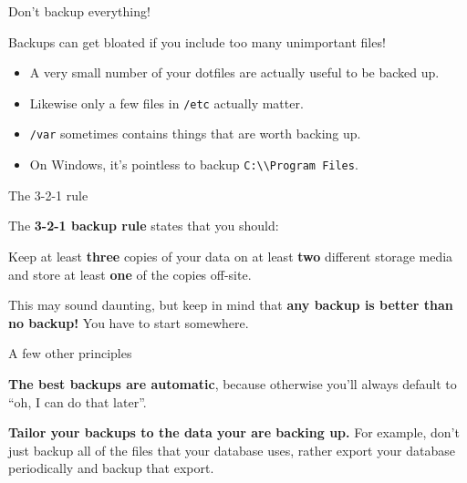 \documentclass{lug}
\begin{document}
\begin{frame}{Don't backup everything!}

    Backups can get bloated if you include too many unimportant files!

    \begin{itemize}[<+->]
        \item A very small number of your dotfiles are actually useful to be
            backed up.
        \item Likewise only a few files in \texttt{/etc} actually matter.
        \item \texttt{/var} sometimes contains things that are worth backing up.
        \item On Windows, it's pointless to backup
            \texttt{C:\textbackslash\textbackslash Program Files}.
    \end{itemize}

\end{frame}

\begin{frame}{The 3-2-1 rule}

    The \textbf{3-2-1 backup rule} states that you should:

    Keep at least \textbf{three} copies of your data \pause on at least
    \textbf{two} different storage media \pause and store at least \textbf{one}
    of the copies off-site.

    \pause This may sound daunting, but keep in mind that \textbf{any backup is
    better than no backup!} You have to start somewhere.

\end{frame}

\begin{frame}{A few other principles}

    \textbf{The best backups are automatic}, because otherwise you'll always
    default to ``oh, I can do that later''.

    \textbf{Tailor your backups to the data your are backing up.} For example,
    don't just backup all of the files that your database uses, rather export
    your database periodically and backup that export.

\end{frame}
\end{document}

